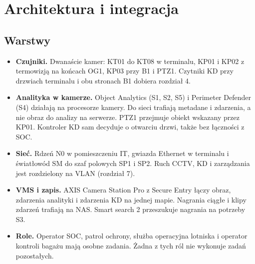 \section{Architektura i integracja}


\subsection*{Warstwy}
\begin{itemize}[noitemsep]
  \item \textbf{Czujniki.} Dwanaście kamer: KT01 do KT08 w terminalu, KP01 i KP02 z termowizją na końcach OG1, KP03 przy B1 i PTZ1. Czytniki KD przy drzwiach terminalu i obu stronach B1 dobiera rozdział 4.
  \item \textbf{Analityka w kamerze.} Object Analytics (S1, S2, S5) i Perimeter Defender (S4) działają na procesorze kamery. Do sieci trafiają metadane i zdarzenia, a nie obraz do analizy na serwerze.\cite{S-AOA,S-PD} PTZ1 przejmuje obiekt wskazany przez KP01.\cite{S-PDPTZ} Kontroler KD sam decyduje o otwarciu drzwi, także bez łączności z SOC.\cite{S-KD}
  \item \textbf{Sieć.} Rdzeń N0 w pomieszczeniu IT, gwiazda Ethernet w terminalu i światłowód SM do szaf polowych SP1 i SP2. Ruch CCTV, KD i zarządzania jest rozdzielony na VLAN (rozdział 7).
  \item \textbf{VMS i zapis.} AXIS Camera Station Pro z Secure Entry łączy obraz, zdarzenia analityki i zdarzenia KD na jednej mapie. Nagrania ciągłe i klipy zdarzeń trafiają na NAS. Smart search 2 przeszukuje nagrania na potrzeby S3.\cite{S-VMS,S-SS2}
  \item \textbf{Role.} Operator SOC, patrol ochrony, służba operacyjna lotniska i operator kontroli bagażu mają osobne zadania. Żadna z tych ról nie wykonuje zadań pozostałych.
\end{itemize}

